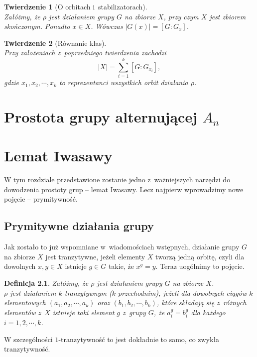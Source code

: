 \documentclass[licencjacka]{pracamgr}
\newtheorem{deff}{Definicja}[section]
\newtheorem{thh}{Twierdzenie}[section]
\begin{document}
\begin{thh}[O orbitach i~stabilizatorach] $ $\\
	Załóżmy, że $\rho$ jest działaniem grupy $G$ na zbiorze $X$, przy czym $X$ jest zbiorem skończonym.
	Ponadto $x \in X$. Wówczas $|G(x)| = [G : G_x]$.
\end{thh}

\begin{thh}[Równanie klas] $ $\\
	Przy założeniach z~poprzedniego twierdzenia zachodzi
	$$ |X| = \sum_{i=1}^k [G : G_{x_i}] ,$$
	gdzie $x_1, x_2, \cdots, x_k$ to reprezentanci wszystkich orbit działania $\rho$.
\end{thh}



\chapter{Prostota grupy alternującej $A_n$}




\chapter{Lemat Iwasawy}
W tym rozdziale przedstawione zostanie jedno z~ważniejszych narzędzi do dowodzenia prostoty grup -- lemat Iwasawy.
Lecz najpierw wprowadzimy nowe pojęcie --  prymitywność.

\section{Prymitywne działania grupy}
Jak zostało to już wspomniane w~wiadomościach wstępnych, działanie grupy $G$ na zbiorze $X$ jest tranzytywne, 
jeżeli elementy $X$ tworzą jedną orbitę, czyli dla dowolnych $x, y \in X$ istnieje $g \in G$ takie, że $x^g = y$.
Teraz uogólnimy to pojęcie.

\begin{deff}
	Załóżmy, że $\rho$ jest działaniem grupy $G$ na zbiorze $X$. \\
	\emph{$\rho$ jest działaniem $k$-tranzytywnym ($k$-przechodnim)}, 
	jeżeli dla dowolnych ciągów $k$ elementowych $(a_1, a_2, \cdots, a_k)$ oraz $(b_1, b_2, \cdots, b_k)$, 
	które składają się z~różnych elementów z~$X$ istnieje taki element $g$ z~grupy $G$, że
	$a_i^g = b_i^g$ dla każdego $i = 1, 2, \cdots, k$.
\end{deff}
W szczególności $1$-tranzytywność to jest dokładnie to samo, co zwykła tranzytywność.
\end{document}
